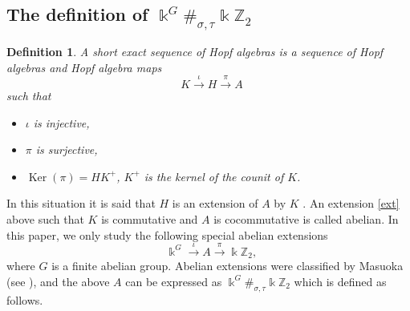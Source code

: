 \documentclass[a4paper,11pt]{amsart}
\def \ker{\operatorname{Ker}}
\def \ker{\operatorname{Ker}}
\numberwithin{equation}{section}
\newtheorem{definition}[theorem]{Definition}
\begin{document}
\subsection{The definition of $\Bbbk^G\#_{\sigma,\tau}\Bbbk \mathbb{Z}_{2}$}
\begin{definition}\label{def2.1.1}
A short exact sequence of Hopf algebras is a sequence of Hopf algebras
and Hopf algebra maps
\begin{equation}\label{ext}
\;\; K\xrightarrow{\iota} H \xrightarrow{\pi} A
\end{equation}
such that
\begin{itemize}
  \item[(i)] $\iota$ is injective,
  \item[(ii)]  $\pi$ is surjective,
  \item[(iii)] $\ker(\pi)= HK^+$, $K^+$ is the kernel of the counit of $K$.
\end{itemize}
\end{definition}
In this situation it is said that $H$ is an extension of $A$ by $K$ \cite[Definiton 1.4]{M3}. An extension \eqref{ext} above such that $K$ is commutative and $A$ is cocommutative is called abelian.
In this paper, we only study the following special abelian extensions
\begin{equation*}
\;\; \Bbbk^G\xrightarrow{\iota} A \xrightarrow{\pi} \Bbbk \mathbb{Z}_{2},
\end{equation*}
where $G$ is a finite abelian group. Abelian extensions were classified by Masuoka
(see \cite[Proposition 1.5]{M3}), and the above $A$ can be expressed as $\Bbbk^G\#_{\sigma,\tau}\Bbbk \mathbb{Z}_{2}$ which is defined as follows.
\end{document}
